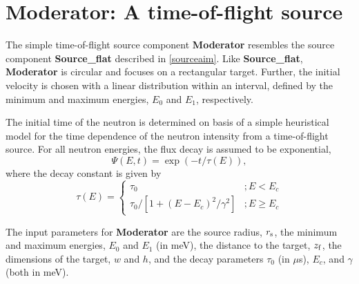 
\section{Moderator: A time-of-flight source}
The simple time-of-flight source component {\bf Moderator} resembles
the source component {\bf Source\_flat} described in \ref{sourceaim}.
Like {\bf Source\_flat}, {\bf Moderator} is circular and focuses
on a rectangular target. Further, the initial velocity is chosen
with a linear distribution within an interval, defined by the
minimum and maximum energies, $E_0$ and $E_1$,
respectively.

The initial time of the neutron is determined on basis of a 
simple heuristical model for the time dependence of the 
neutron intensity from a time-of-flight source.
For all neutron energies, the flux decay is assumed to be exponential,
\begin{equation}
\Psi(E,t) = \exp(-t/\tau(E)) ,
\end{equation}
where the decay constant is given by
\begin{equation}
\tau(E) = \left\{ 
\begin{array}{cc}
 \tau_0                               & ; E<E_c \\
 \tau_0 / [ 1 + (E-E_c)^2/\gamma^2 ]  & ; E \geq E_c
\end{array}
\right.
\end{equation}

The input parameters for {\bf Moderator} are the source radius, $r_{\rm s}$,
the minimum and maximum energies, $E_0$ and $E_1$ (in meV),
the distance to the target, $z_{\rm f}$, the dimensions of the target,
$w$ and $h$, and the decay parameters 
$\tau_0$ (in $\mu$s), $E_c$, and $\gamma$ (both in meV).

